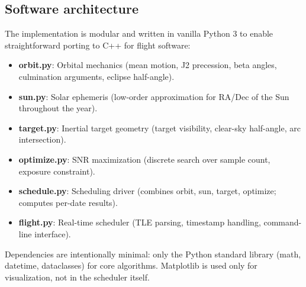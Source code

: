 \documentclass[preprint,12pt]{elsarticle}
\theoremstyle{definition}
\theoremstyle{remark}
\begin{document}
\subsection{Software architecture}

The implementation is modular and written in vanilla Python 3 to enable straightforward porting to C++ for flight software:

\begin{itemize}
\item \textbf{orbit.py}: Orbital mechanics (mean motion, J2 precession, beta angles, culmination arguments, eclipse half-angle).
\item \textbf{sun.py}: Solar ephemeris (low-order approximation for RA/Dec of the Sun throughout the year).
\item \textbf{target.py}: Inertial target geometry (target visibility, clear-sky half-angle, arc intersection).
\item \textbf{optimize.py}: SNR maximization (discrete search over sample count, exposure constraint).
\item \textbf{schedule.py}: Scheduling driver (combines orbit, sun, target, optimize; computes per-date results).
\item \textbf{flight.py}: Real-time scheduler (TLE parsing, timestamp handling, command-line interface).
\end{itemize}

Dependencies are intentionally minimal: only the Python standard library (math, datetime, dataclasses) for core algorithms. Matplotlib is used only for visualization, not in the scheduler itself.
\end{document}
